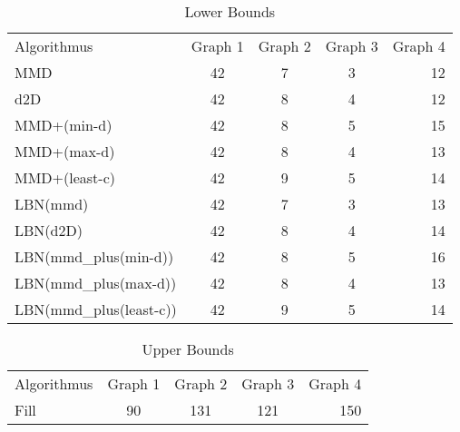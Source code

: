\begin{table}[h]
	\caption{Lower Bounds}
	\begin{tabular}{l c c c r}
		Algorithmus & Graph 1 & Graph 2 & Graph 3 & Graph 4 \\
		MMD & 42 & 7 & 3 & 12 \\
		d2D & 42 & 8 & 4 & 12 \\
		MMD+(min-d) & 42 & 8 & 5 & 15 \\
		MMD+(max-d) & 42 & 8 & 4 & 13 \\
		MMD+(least-c) & 42 & 9 & 5 & 14 \\
		LBN(mmd) & 42 & 7 & 3 & 13 \\
		LBN(d2D) & 42 & 8 & 4 & 14 \\
		LBN(mmd\_plus(min-d)) & 42 & 8 & 5 & 16 \\
		LBN(mmd\_plus(max-d)) & 42 & 8 & 4 & 13 \\
		LBN(mmd\_plus(least-c)) & 42 & 9 & 5 & 14 \\
	\end{tabular}
\end{table}

\begin{table}[h]
	\caption{Upper Bounds}
	\begin{tabular}{lcccr}
		Algorithmus & Graph 1 & Graph 2 & Graph 3 & Graph 4 \\
		Fill & 90 & 131 & 121 & 150 \\
	\end{tabular}
\end{table}


